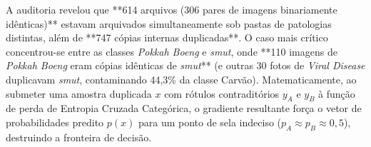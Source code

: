 \documentclass[12pt]{article}
\begin{document}
\begin{table}[htbp]
\centering
\caption{Auditoria Forense por Hash MD5 e Saneamento do Dataset Primário (11 Classes)}
\label{tab:auditoria_dataset}
\end{table}

A auditoria revelou que **614 arquivos (306 pares de imagens binariamente idênticas)** estavam arquivados simultaneamente sob pastas de patologias distintas, além de **747 cópias internas duplicadas**. O caso mais crítico concentrou-se entre as classes \textit{Pokkah Boeng} e \textit{smut}, onde **110 imagens de \textit{Pokkah Boeng} eram cópias idênticas de \textit{smut}** (e outras 30 fotos de \textit{Viral Disease} duplicavam \textit{smut}, contaminando 44,3\% da classe Carvão). Matematicamente, ao submeter uma amostra duplicada $x$ com rótulos contraditórios $y_A$ e $y_B$ à função de perda de Entropia Cruzada Categórica, o gradiente resultante força o vetor de probabilidades predito $p(x)$ para um ponto de sela indeciso ($p_A \approx p_B \approx 0,5$), destruindo a fronteira de decisão.
\end{document}
